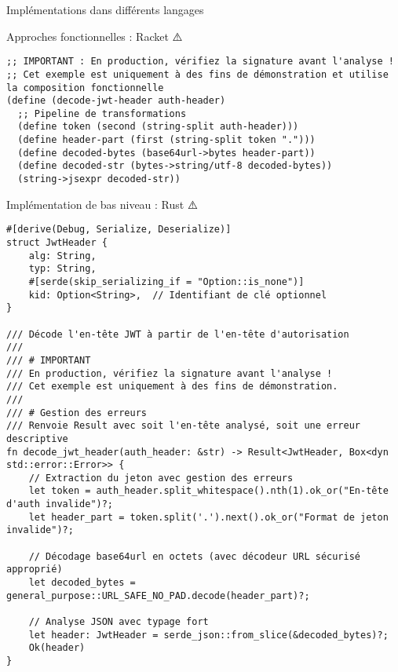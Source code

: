 \documentclass[presentation,aspectratio=169]{beamer}
\begin{document}
\begin{frame}[label={sec:org25093b4},fragile]{Implémentations dans différents langages}
\begin{block}{Approches fonctionnelles : Racket ⚠️}
\begin{verbatim}
;; IMPORTANT : En production, vérifiez la signature avant l'analyse !
;; Cet exemple est uniquement à des fins de démonstration et utilise la composition fonctionnelle
(define (decode-jwt-header auth-header)
  ;; Pipeline de transformations
  (define token (second (string-split auth-header)))
  (define header-part (first (string-split token ".")))
  (define decoded-bytes (base64url->bytes header-part))
  (define decoded-str (bytes->string/utf-8 decoded-bytes))
  (string->jsexpr decoded-str))
\end{verbatim}
\end{block}
\begin{block}{Implémentation de bas niveau : Rust ⚠️}
\begin{verbatim}
#[derive(Debug, Serialize, Deserialize)]
struct JwtHeader {
    alg: String,
    typ: String,
    #[serde(skip_serializing_if = "Option::is_none")]
    kid: Option<String>,  // Identifiant de clé optionnel
}

/// Décode l'en-tête JWT à partir de l'en-tête d'autorisation
/// 
/// # IMPORTANT
/// En production, vérifiez la signature avant l'analyse !
/// Cet exemple est uniquement à des fins de démonstration.
/// 
/// # Gestion des erreurs
/// Renvoie Result avec soit l'en-tête analysé, soit une erreur descriptive
fn decode_jwt_header(auth_header: &str) -> Result<JwtHeader, Box<dyn std::error::Error>> {
    // Extraction du jeton avec gestion des erreurs
    let token = auth_header.split_whitespace().nth(1).ok_or("En-tête d'auth invalide")?;
    let header_part = token.split('.').next().ok_or("Format de jeton invalide")?;

    // Décodage base64url en octets (avec décodeur URL sécurisé approprié)
    let decoded_bytes = general_purpose::URL_SAFE_NO_PAD.decode(header_part)?;

    // Analyse JSON avec typage fort
    let header: JwtHeader = serde_json::from_slice(&decoded_bytes)?;
    Ok(header)
}
\end{verbatim}
\end{block}
\end{frame}
\end{document}
